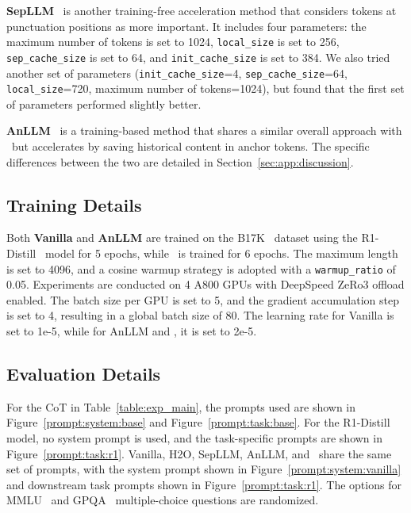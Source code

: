 \textbf{SepLLM}~\citep{arxiv24_sepllm} is another training-free acceleration method that considers tokens at punctuation positions as more important. 
It includes four parameters: the maximum number of tokens is set to 1024, \texttt{local\_size} is set to 256, \texttt{sep\_cache\_size} is set to 64, and \texttt{init\_cache\_size} is set to 384. 
We also tried another set of parameters (\texttt{init\_cache\_size}=4, \texttt{sep\_cache\_size}=64, \texttt{local\_size}=720, maximum number of tokens=1024), but found that the first set of parameters performed slightly better.

\textbf{AnLLM}~\citep{acl24_anllm} is a training-based method that shares a similar overall approach with \ours~but accelerates by saving historical content in anchor tokens. 
The specific differences between the two are detailed in Section~\ref{sec:app:discussion}.

\subsection{Training Details}
\label{sec:app:exp:training_details}
Both \textbf{Vanilla} and \textbf{AnLLM} are trained on the B17K~\citep{bespoke_stratos_train_dataset} dataset using the R1-Distill~\citep{arxiv25_deepseek_r1} model for 5 epochs, while \ours~is trained for 6 epochs. 
The maximum length is set to 4096, and a cosine warmup strategy is adopted with a \texttt{warmup\_ratio} of 0.05. 
Experiments are conducted on 4 A800 GPUs with DeepSpeed ZeRo3 offload enabled. 
The batch size per GPU is set to 5, and the gradient accumulation step is set to 4, resulting in a global batch size of 80. 
The learning rate for Vanilla is set to 1e-5, while for AnLLM and \ours, it is set to 2e-5.

\subsection{Evaluation Details}
\label{sec:app:exp:evaluation_details}
For the CoT in Table~\ref{table:exp_main}, the prompts used are shown in Figure~\ref{prompt:system:base} and Figure~\ref{prompt:task:base}. 
For the R1-Distill model, no system prompt is used, and the task-specific prompts are shown in Figure~\ref{prompt:task:r1}. 
Vanilla, H2O, SepLLM, AnLLM, and \ours~share the same set of prompts, with the system prompt shown in Figure~\ref{prompt:system:vanilla} and downstream task prompts shown in Figure~\ref{prompt:task:r1}. 
The options for MMLU~\citep{iclr21_mmlu} and GPQA~\citep{colm24_gpqa} multiple-choice questions are randomized.

